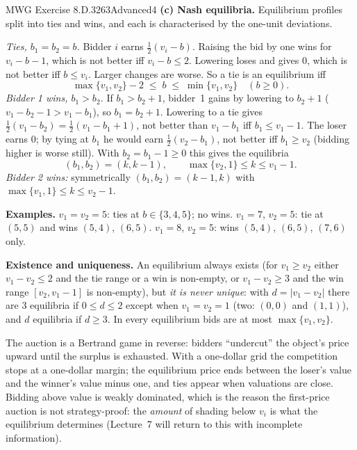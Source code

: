 \begin{exsol}{MWG Exercise 8.D.3}{263}{Advanced}{4}
\textbf{(c) Nash equilibria.} Equilibrium profiles split into ties and wins, and each is characterised by
the one-unit deviations.

\emph{Ties, $b_1 = b_2 = b$.} Bidder $i$ earns $\tfrac12(v_i - b)$.
Raising the bid by one wins for $v_i - b - 1$, which is not better iff $v_i - b \le 2$. Lowering loses and gives $0$,
which is not better iff $b \le v_i$. Larger changes are worse. So a tie is an equilibrium iff
\[
  \max\{v_1, v_2\} - 2 \;\le\; b \;\le\; \min\{v_1, v_2\} \quad (b \ge 0).
\]
\emph{Bidder 1 wins, $b_1 > b_2$.} If $b_1 > b_2 + 1$, bidder~1 gains by lowering to $b_2 + 1$
($v_1 - b_2 - 1 > v_1 - b_1$), so $b_1 = b_2 + 1$. Lowering to a tie gives $\tfrac12(v_1 - b_2) = \tfrac12 (v_1 - b_1 + 1)$,
not better than $v_1 - b_1$ iff $b_1 \le v_1 - 1$. The loser earns $0$; by tying at $b_1$ he would
earn $\tfrac12(v_2 - b_1)$, not better iff $b_1 \ge v_2$ (bidding higher is worse still). With
$b_2 = b_1 - 1 \ge 0$ this gives the equilibria
\[
  (b_1, b_2) = (k, k - 1), \qquad \max\{v_2, 1\} \le k \le v_1 - 1 .
\]
\emph{Bidder 2 wins:} symmetrically $(b_1, b_2) = (k - 1, k)$ with $\max\{v_1, 1\} \le k \le v_2 - 1$.

\textbf{Examples.} $v_1 = v_2 = 5$: ties at $b \in \{3,4,5\}$; no wins. $v_1 = 7$, $v_2 = 5$: tie at $(5,5)$ and
wins $(5,4)$, $(6,5)$. $v_1 = 8$, $v_2 = 5$: wins $(5,4)$, $(6,5)$, $(7,6)$ only.

\textbf{Existence and uniqueness.} An equilibrium always exists (for $v_1 \ge v_2$ either $v_1 - v_2 \le 2$ and the tie
range or a win is non-empty, or $v_1 - v_2 \ge 3$ and the win range $[v_2, v_1 - 1]$ is non-empty), but \emph{it is never
unique}: with $d = |v_1 - v_2|$ there are $3$ equilibria if $0 \le d \le 2$ except when $v_1 = v_2 = 1$ (two:
$(0,0)$ and $(1,1)$), and $d$ equilibria if $d \ge 3$. In every equilibrium bids are at most $\max\{v_1, v_2\}$.


\interp The auction is a Bertrand game in reverse: bidders ``undercut'' the object's price upward
until the surplus is exhausted. With a one-dollar grid the competition stops at a one-dollar margin; the
equilibrium price ends between the loser's value and the winner's value minus one, and ties appear
when valuations are close. Bidding above value is weakly dominated, which is the reason the first-price
auction is not strategy-proof: the \emph{amount} of shading below $v_i$ is what the equilibrium determines
(Lecture~7 will return to this with incomplete information).


\end{exsol}
